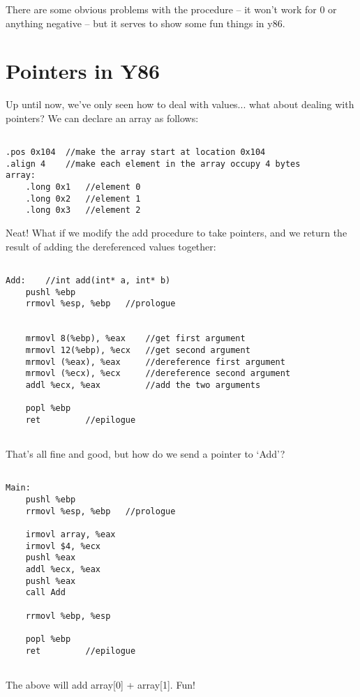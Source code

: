 \documentclass[10pt]{article}
\begin{document}
There are some obvious problems with the procedure -- it won't work for 0 or anything negative -- but it serves to show some fun things in y86.

\section{Pointers in Y86}


Up until now, we've only seen how to deal with values... what about dealing with pointers? We can declare an array as follows:


\begin{lstlisting}

.pos 0x104  //make the array start at location 0x104
.align 4    //make each element in the array occupy 4 bytes
array:
    .long 0x1   //element 0
    .long 0x2   //element 1
    .long 0x3   //element 2
\end{lstlisting}

\newpage

Neat! What if we modify the add procedure to take pointers, and we return the result of adding the dereferenced values together:



\begin{lstlisting}

Add:    //int add(int* a, int* b)
    pushl %ebp
    rrmovl %esp, %ebp   //prologue
    
    
    mrmovl 8(%ebp), %eax    //get first argument
    mrmovl 12(%ebp), %ecx   //get second argument
    mrmovl (%eax), %eax     //dereference first argument
    mrmovl (%ecx), %ecx     //dereference second argument
    addl %ecx, %eax         //add the two arguments
    
    popl %ebp
    ret         //epilogue


\end{lstlisting}


That's all fine and good, but how do we send a pointer to `Add'?


\begin{lstlisting}

Main:    
    pushl %ebp
    rrmovl %esp, %ebp   //prologue
    
    irmovl array, %eax
    irmovl $4, %ecx
    pushl %eax
    addl %ecx, %eax
    pushl %eax
    call Add

    rrmovl %ebp, %esp
    
    popl %ebp
    ret         //epilogue


\end{lstlisting}

The above will add array[0] + array[1]. Fun!
\end{document}
